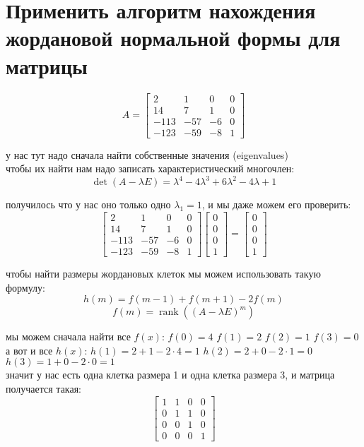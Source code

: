 \documentclass{article}
\renewcommand{\l}{\left}
\renewcommand{\r}{\right}
\DeclareMathOperator{\rank}{rank}
\begin{document}
  \section{Применить алгоритм нахождения жордановой нормальной формы для матрицы}
  $$A = \begin{bmatrix}2 & 1 & 0 & 0\\14 & 7 & 1 & 0\\-113 & -57 & -6 & 0\\-123 & -59 & -8 & 1\end{bmatrix}$$

  \noindent
  у нас тут надо сначала найти собственные значения (eigenvalues) \\
  чтобы их найти нам надо записать характеристический многочлен:
  $$ \det(A - \lambda E) = \lambda^{4} - 4 \lambda^{3} + 6 \lambda^{2} - 4 \lambda + 1 $$

  \noindent
  получилось что у нас оно только одно $\lambda_1 = 1$, и мы даже можем его проверить:
  $$ \begin{bmatrix}2 & 1 & 0 & 0\\14 & 7 & 1 & 0\\-113 & -57 & -6 & 0\\-123 & -59 & -8 & 1\end{bmatrix}\begin{bmatrix}0\\0\\0\\1\end{bmatrix} = \begin{bmatrix}0\\0\\0\\1\end{bmatrix} $$

  \noindent
  чтобы найти размеры жордановых клеток мы можем использовать такую формулу:
  $$ h(m) = f(m-1)+f(m+1) - 2f(m) $$
  $$ f(m) = \rank\l((A-\lambda E)^m\r) $$

  \noindent
  мы можем сначала найти все $f(x)$: \hfill $f(0) = 4$ \hfill $f(1) = 2$ \hfill $f(2) = 1$ \hfill $f(3) = 0$ \\
  а вот и все $h(x)$: \hfill $h(1) = 2+1 - 2 \cdot 4 = 1$ \hfill $h(2) = 2+0 - 2 \cdot 1 = 0$ \hfill $h(3) = 1+0 - 2 \cdot 0 = 1$ \\
  значит у нас есть одна клетка размера 1 и одна клетка размера 3, и матрица получается такая:
  $$ \begin{bmatrix}1 & 1 & 0 & 0\\0 & 1 & 1 & 0\\0 & 0 & 1 & 0\\0 & 0 & 0 & 1\end{bmatrix} $$
\end{document}
